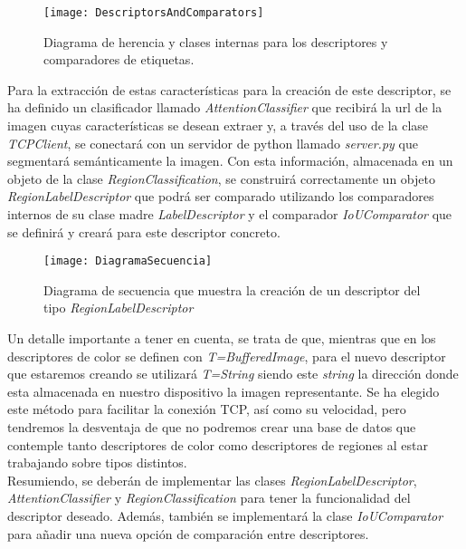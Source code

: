 \begin{figure}[htpb]
  \centering
  \texttt{[image: DescriptorsAndComparators]}
  \caption{Diagrama de herencia y clases internas para los descriptores y comparadores de etiquetas. \cite{JMR}}
  \label{fig:DescriptorsAndComparators}
\end{figure}

Para la extracción de estas características para la creación de este descriptor, se ha definido un clasificador llamado \emph{AttentionClassifier} que recibirá la url de la imagen cuyas características se desean extraer y, a través del uso de la clase \emph{TCPClient}, se conectará con un servidor de python llamado \emph{server.py} que segmentará semánticamente la imagen. Con esta información, almacenada en un objeto de la clase \emph{RegionClassification}, se construirá correctamente un objeto \emph{RegionLabelDescriptor} que podrá ser comparado utilizando los comparadores internos de su clase madre \emph{LabelDescriptor} y el comparador \emph{IoUComparator} que se definirá y creará para este descriptor concreto.\\

\begin{figure}[htpb]
  \centering
  \texttt{[image: DiagramaSecuencia]}
  \caption{Diagrama de secuencia que muestra la creación de un descriptor del tipo \emph{RegionLabelDescriptor}}
  \label{fig:DiagramaSecuencia}
\end{figure}

Un detalle importante a tener en cuenta, se trata de que, mientras que en los descriptores de color se definen con \emph{T=BufferedImage}, para el nuevo descriptor que estaremos creando se utilizará \emph{T=String} siendo este \emph{string} la dirección donde esta almacenada en nuestro dispositivo la imagen representante. Se ha elegido este método para facilitar la conexión TCP, así como su velocidad, pero tendremos la desventaja de que no podremos crear una base de datos que contemple tanto descriptores de color como descriptores de regiones al estar trabajando sobre tipos distintos.\\

Resumiendo, se deberán de implementar las clases \emph{RegionLabelDescriptor}, \emph{AttentionClassifier} y \emph{RegionClassification} para tener la funcionalidad del descriptor deseado. Además, también se implementará la clase \emph{IoUComparator} para añadir una nueva opción de comparación entre descriptores.\\

